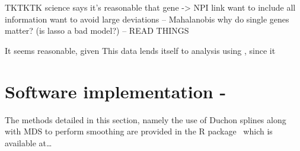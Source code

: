 TKTKTK
   science says it's reasonable that gene -> NPI link
   want to include all information
   want to avoid large deviations -- Mahalanobis
   why do single genes matter? (is lasso a bad model?) -- READ THINGS


It seems reasonable, given This data lends itself to analysis using \mdsds, since it








\section{Software implementation - \mdspack}

The methods detailed in this section, namely the use of Duchon splines along with MDS to perform smoothing are provided in the \textsf{R} package \mdspack\ which is available at\ldots



